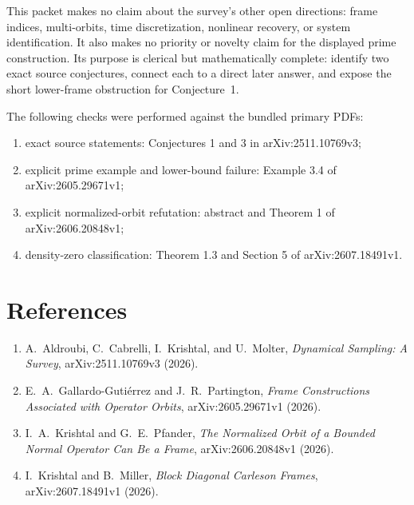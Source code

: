 \documentclass[11pt]{article}
\begin{document}
This packet makes no claim about the survey's other open directions: frame
indices, multi-orbits, time discretization, nonlinear recovery, or system
identification.  It also makes no priority or novelty claim for the displayed
prime construction.  Its purpose is clerical but mathematically complete:
identify two exact source conjectures, connect each to a direct later answer,
and expose the short lower-frame obstruction for Conjecture~1.

The following checks were performed against the bundled primary PDFs:
\begin{enumerate}[leftmargin=*]
\item exact source statements: Conjectures 1 and 3 in arXiv:2511.10769v3;
\item explicit prime example and lower-bound failure: Example 3.4 of
arXiv:2605.29671v1;
\item explicit normalized-orbit refutation: abstract and Theorem 1 of
arXiv:2606.20848v1;
\item density-zero classification: Theorem 1.3 and Section 5 of
arXiv:2607.18491v1.
\end{enumerate}

\section{References}

\begin{enumerate}[leftmargin=*]
\item A.~Aldroubi, C.~Cabrelli, I.~Krishtal, and U.~Molter,
\emph{Dynamical Sampling: A Survey}, arXiv:2511.10769v3 (2026).
\item E.~A.~Gallardo-Guti\'errez and J.~R.~Partington,
\emph{Frame Constructions Associated with Operator Orbits},
arXiv:2605.29671v1 (2026).
\item I.~A.~Krishtal and G.~E.~Pfander,
\emph{The Normalized Orbit of a Bounded Normal Operator Can Be a Frame},
arXiv:2606.20848v1 (2026).
\item I.~Krishtal and B.~Miller,
\emph{Block Diagonal Carleson Frames}, arXiv:2607.18491v1 (2026).
\end{enumerate}
\end{document}

